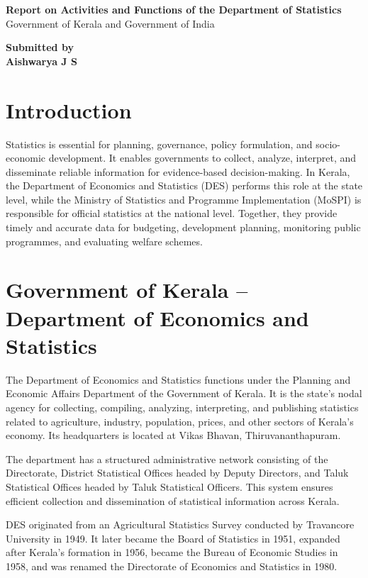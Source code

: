 \documentclass[12pt]{article}
\begin{document}
\begin{center}
{\Large \textbf{Report on Activities and Functions of the Department of Statistics}}\\[0.2cm]
{\large Government of Kerala and Government of India}

\vspace{0.5cm}

\textbf{Submitted by}\\
\textbf{Aishwarya J S}
\end{center}

\section*{Introduction}

Statistics is essential for planning, governance, policy formulation, and socio-economic development. It enables governments to collect, analyze, interpret, and disseminate reliable information for evidence-based decision-making. In Kerala, the Department of Economics and Statistics (DES) performs this role at the state level, while the Ministry of Statistics and Programme Implementation (MoSPI) is responsible for official statistics at the national level. Together, they provide timely and accurate data for budgeting, development planning, monitoring public programmes, and evaluating welfare schemes.

\section*{Government of Kerala -- Department of Economics and Statistics}

The Department of Economics and Statistics functions under the Planning and Economic Affairs Department of the Government of Kerala. It is the state's nodal agency for collecting, compiling, analyzing, interpreting, and publishing statistics related to agriculture, industry, population, prices, and other sectors of Kerala's economy. Its headquarters is located at Vikas Bhavan, Thiruvananthapuram.

The department has a structured administrative network consisting of the Directorate, District Statistical Offices headed by Deputy Directors, and Taluk Statistical Offices headed by Taluk Statistical Officers. This system ensures efficient collection and dissemination of statistical information across Kerala.

DES originated from an Agricultural Statistics Survey conducted by Travancore University in 1949. It later became the Board of Statistics in 1951, expanded after Kerala's formation in 1956, became the Bureau of Economic Studies in 1958, and was renamed the Directorate of Economics and Statistics in 1980.
\end{document}
